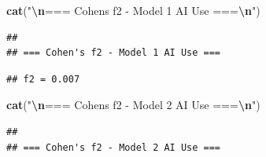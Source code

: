 \documentclass[
]{article}
\newenvironment{Shaded}{\begin{snugshade}}{\end{snugshade}}
\newcommand{\DecValTok}[1]{\textcolor[rgb]{0.00,0.00,0.81}{#1}}
\newcommand{\FunctionTok}[1]{\textcolor[rgb]{0.13,0.29,0.53}{\textbf{#1}}}
\newcommand{\NormalTok}[1]{#1}
\newcommand{\SpecialCharTok}[1]{\textcolor[rgb]{0.81,0.36,0.00}{\textbf{#1}}}
\newcommand{\StringTok}[1]{\textcolor[rgb]{0.31,0.60,0.02}{#1}}
\begin{document}
\begin{Shaded}
\begin{Highlighting}[]
\FunctionTok{cat}\NormalTok{(}\StringTok{"}\SpecialCharTok{\textbackslash{}n}\StringTok{=== Cohen\textquotesingle{}s f2 {-} Model 1 AI Use ===}\SpecialCharTok{\textbackslash{}n}\StringTok{"}\NormalTok{)}
\end{Highlighting}
\end{Shaded}

\begin{verbatim}
## 
## === Cohen's f2 - Model 1 AI Use ===
\end{verbatim}

\begin{Shaded}
\end{Shaded}

\begin{verbatim}
## f2 = 0.007
\end{verbatim}

\begin{Shaded}
\begin{Highlighting}[]
\FunctionTok{cat}\NormalTok{(}\StringTok{"}\SpecialCharTok{\textbackslash{}n}\StringTok{=== Cohen\textquotesingle{}s f2 {-} Model 2 AI Use ===}\SpecialCharTok{\textbackslash{}n}\StringTok{"}\NormalTok{)}
\end{Highlighting}
\end{Shaded}

\begin{verbatim}
## 
## === Cohen's f2 - Model 2 AI Use ===
\end{verbatim}

\begin{Shaded}
\end{Shaded}
\end{document}
